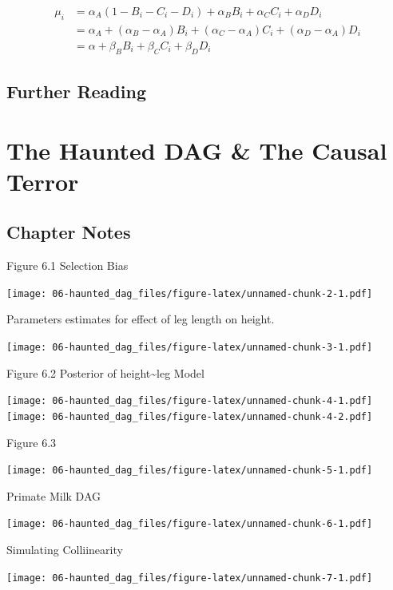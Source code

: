 \documentclass[
]{book}
\begin{document}
\[
\begin{aligned}
\mu_i &= \alpha_A(1 − B_i − C_i −D_i) + \alpha_B B_i + \alpha_C C_i + \alpha_D D_i \\
&= \alpha_A + (\alpha_B-\alpha_A)B_i + (\alpha_C -\alpha_A)C_i +(\alpha_D-\alpha_A)D_i  \\
&= \alpha + \beta_B B_i + \beta_C C_i + \beta_D D_i
\end{aligned}          
\]

\hypertarget{further-reading-4}{%
\section*{Further Reading}\label{further-reading-4}}

\hypertarget{haunted_dag}{%
\chapter{The Haunted DAG \& The Causal Terror}\label{haunted_dag}}

\hypertarget{chapter-notes-5}{%
\section{Chapter Notes}\label{chapter-notes-5}}

Figure 6.1 Selection Bias

\texttt{[image: 06-haunted\_dag\_files/figure-latex/unnamed-chunk-2-1.pdf]}

Parameters estimates for effect of leg length on height.

\texttt{[image: 06-haunted\_dag\_files/figure-latex/unnamed-chunk-3-1.pdf]}

Figure 6.2 Posterior of height\textasciitilde leg Model

\texttt{[image: 06-haunted\_dag\_files/figure-latex/unnamed-chunk-4-1.pdf]} \texttt{[image: 06-haunted\_dag\_files/figure-latex/unnamed-chunk-4-2.pdf]}

Figure 6.3

\texttt{[image: 06-haunted\_dag\_files/figure-latex/unnamed-chunk-5-1.pdf]}

Primate Milk DAG

\texttt{[image: 06-haunted\_dag\_files/figure-latex/unnamed-chunk-6-1.pdf]}

Simulating Colliinearity

\texttt{[image: 06-haunted\_dag\_files/figure-latex/unnamed-chunk-7-1.pdf]}
\end{document}
